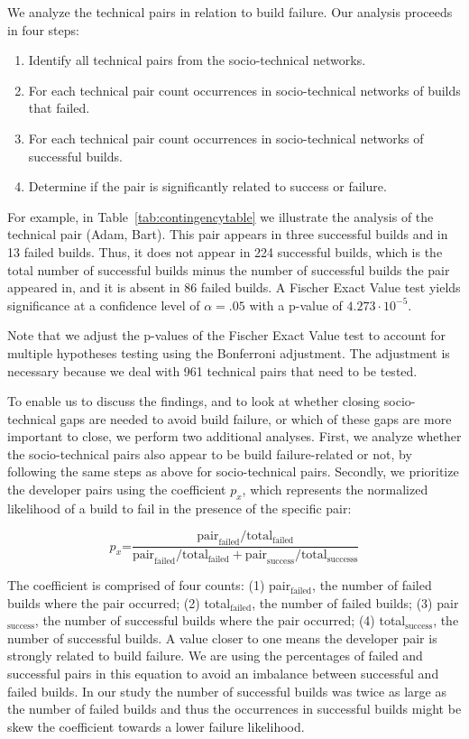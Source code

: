 We analyze the technical pairs in relation to build failure. 
Our analysis proceeds in four steps:

\begin{enumerate}
\item Identify all technical pairs from the socio-technical networks.
\item For each technical pair count occurrences in socio-technical networks of
builds that failed.
\item For each technical pair count occurrences in socio-technical networks of
successful builds.
\item Determine if the pair is significantly related to success or failure.
\end{enumerate}

For example, in Table~\ref{tab:contingencytable} we illustrate the analysis of
the technical pair (Adam, Bart). This pair appears in three successful builds and in
13 failed builds. Thus, it does not appear in 224 successful builds, which is the total number of successful builds minus the number of successful builds the pair appeared in, and it is absent in 86 failed builds.
A Fischer Exact Value test yields significance at a confidence level of $\alpha = .05$ with a p-value of $4.273\cdot10^{-5}$.

Note that we adjust the p-values of the Fischer Exact Value test to account for multiple hypotheses testing using the Bonferroni adjustment.
The adjustment is necessary because we deal with 961 technical pairs that need to be tested. 

To enable us to discuss the findings, and to look at whether closing socio-technical gaps
are needed to avoid build failure, or which of these gaps are more important to
close, we perform two additional analyses. 
First, we analyze whether the
socio-technical pairs also appear to be build failure-related or not, by
following the same steps as above for socio-technical pairs. 
%
Secondly, we prioritize the developer pairs using the coefficient $p_x$,
which represents the normalized likelihood of a build
to fail in the presence of the specific pair:

\begin{equation}
p_x\text{=}\frac{ \text{pair}_{\text{failed}} / \text{total}_{\text{failed}} }
                     { \text{pair}_{\text{failed}} / \text{total}_{\text{failed}} + \text{pair}_{\text{success}} / \text{total}_{\text{successs}}}
\end{equation}

The coefficient is comprised of four counts: (1) pair$_{\text{failed}}$, the number of failed builds where the pair occurred; (2) total$_{\text{failed}}$, the number of failed builds; (3) pair$_{\text{success}}$, the number of successful builds where the pair occurred; (4) total$_{\text{success}}$, the number of successful builds.
A value closer to one means the developer pair is strongly related to build
failure.
We are using the percentages of failed and successful pairs in this equation to avoid an imbalance between successful and failed builds.
In our study the number of successful builds was twice as large as the number of failed builds and thus the occurrences in successful builds might be skew the coefficient towards a lower failure likelihood.


